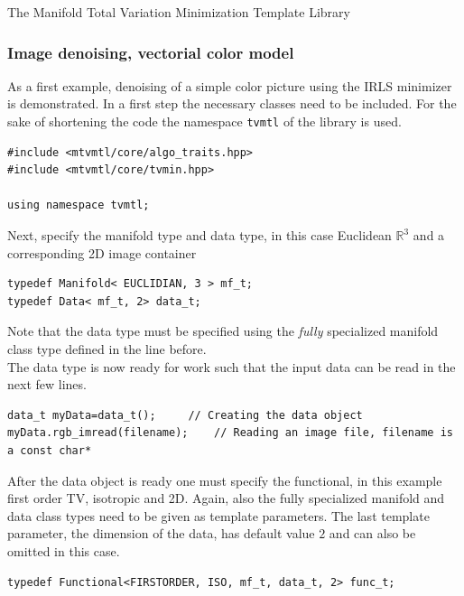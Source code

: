 \begin{chapter}{The Manifold Total Variation Minimization Template Library}
\subsubsection{Image denoising, vectorial color model} %
\label{ssub:Image denoising, vectorial color model}
As a first example, denoising of a simple color picture using the IRLS minimizer is demonstrated. In a first step the necessary classes need to be included. For the sake of shortening the 
code the namespace \texttt{tvmtl} of the library is used. \\
\cppinline
\begin{lstlisting}[label=code:tut_include,caption={Inclusion of library headers}]
#include <mtvmtl/core/algo_traits.hpp>
#include <mtvmtl/core/tvmin.hpp>

using namespace tvmtl;
\end{lstlisting}

Next, specify the manifold type and data type, in this case Euclidean $\mathbb{R}^3$ and a corresponding 2D image container\\

\cppinline
\begin{lstlisting}[label=code:tut_typedef,caption={Specification of manifold and data type}]
typedef Manifold< EUCLIDIAN, 3 > mf_t;
typedef Data< mf_t, 2> data_t;
\end{lstlisting}

Note that the data type must be specified using the \textit{fully} specialized manifold class type defined in the line before.\\
The data type is now ready for work such that the input data can be read in the next few lines.\\

\cppinline
\begin{lstlisting}[label=code:tut_data,caption={Initialization and input of image data}]
data_t myData=data_t();		// Creating the data object
myData.rgb_imread(filename);	// Reading an image file, filename is a const char*
\end{lstlisting}

After the data object is ready one must specify the functional, in this example first order TV, isotropic and 2D. Again,
also the fully specialized manifold and data class types need to be given as template parameters. The last template parameter, the dimension of the data, 
has default value $2$ and can also be omitted in this case.\\

\cppinline
\begin{lstlisting}[label=code:tut_func,caption={Defining the functional and setting parameters}]
typedef Functional<FIRSTORDER, ISO, mf_t, data_t, 2> func_t;


\end{lstlisting}
\end{chapter}
